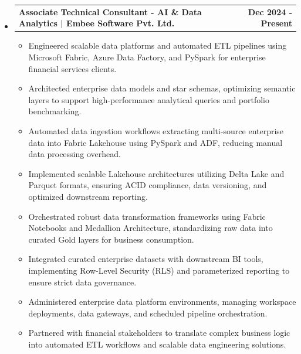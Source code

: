 \documentclass[11pt,letterpaper]{article}
\makeatletter
\newcommand{\headerrow}[2]
{\begin{tabular*}{\linewidth}{l@{\extracolsep{\fill}}r}
#1 &
#2 \\
\end{tabular*}}
\makeatother
\begin{document}
\begin{itemize}[leftmargin=1em,noitemsep]

\item

\headerrow{\textbf{Associate Technical Consultant - AI \& Data Analytics | Embee Software Pvt. Ltd.}}{\textbf{Dec 2024 - Present}}

\begin{itemize}[noitemsep]

\item Engineered scalable data platforms and automated ETL pipelines using Microsoft Fabric, Azure Data Factory, and PySpark for enterprise financial services clients.

\item Architected enterprise data models and star schemas, optimizing semantic layers to support high-performance analytical queries and portfolio benchmarking.

\item Automated data ingestion workflows extracting multi-source enterprise data into Fabric Lakehouse using PySpark and ADF, reducing manual data processing overhead.

\item Implemented scalable Lakehouse architectures utilizing Delta Lake and Parquet formats, ensuring ACID compliance, data versioning, and optimized downstream reporting.

\item Orchestrated robust data transformation frameworks using Fabric Notebooks and Medallion Architecture, standardizing raw data into curated Gold layers for business consumption.

\item Integrated curated enterprise datasets with downstream BI tools, implementing Row-Level Security (RLS) and parameterized reporting to ensure strict data governance.

\item Administered enterprise data platform environments, managing workspace deployments, data gateways, and scheduled pipeline orchestration.

\item Partnered with financial stakeholders to translate complex business logic into automated ETL workflows and scalable data engineering solutions.

\end{itemize}

\end{itemize}
\end{document}

